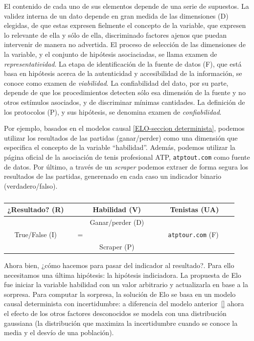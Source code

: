 \documentclass[a4paper,10pt]{book}
\begin{document}

El contenido de cada uno de sus elementos depende de una serie de supuestos.
La validez interna de un dato depende en gran medida de las dimensiones (D) elegidas, de que estas expresen fielmente el concepto de la variable, que expresen lo relevante de ella y sólo de ella, discriminado factores ajenos que puedan intervenir de manera no advertida.
El proceso de selección de las dimensiones de la variable, y el conjunto de hipótesis asociaciadas, se llama examen de \emph{representatividad}.
La etapa de identificación de la fuente de datos (F), que está basa en hipótesis acerca de la autenticidad y accesibilidad de la información, se conoce como examen de \emph{viabilidad}.
La confiabilidad del dato, por su parte, depende de que los procedimientos detecten sólo esa dimensión de la fuente y no otros estímulos asociados, y de discriminar mínimas cantidades.
La definición de los protocolos (P), y sus hipótesis, se denomina examen de \emph{confiabilidad}.


Por ejemplo, basados en el modelos causal \ref{ELO-seccion determinista}, podemos utilizar los resultados de las partidas (ganar/perder) como una dimensión que especifica el concepto de la variable ``habilidad''.
Además, podemos utilizar la página oficial de la asociación de tenis profesional ATP, \texttt{atptout.com} como fuente de datos.
Por último, a través de un \emph{scraper} podemos extraer de forma segura los resultados de las partidas, generenado en cada caso un indicador binario (verdadero/falso).


\begin{table}[ht!]
\centering
\begin{tabular}{clcccc}
¿Resultado? (R) & \multicolumn{1}{r|}{} &  & Habilidad (V) &  &  \multicolumn{1}{|c}{Tenistas (UA)} \\ \hline
   &  \multicolumn{1}{r|}{}    &  & Ganar/perder (D) &  & \multicolumn{1}{|r}{} \\
                 True/False (I)  &   & =  &  &  & \ \ \ \texttt{atptour.com} (F) \ \ \  \\
 & \multicolumn{1}{r|}{} &  & Scraper (P) &        &      \multicolumn{1}{|r}{}
\end{tabular}
\caption{}
\label{tab:operacionalizacion_habilidad}
\end{table}


Ahora bien, ¿cómo hacemos para pasar del indicador al resultado?.
Para ello necesitamos una última hipótesis: la hipótesis indiciadora.
La propuesta de Elo fue iniciar la variable habilidad con un valor arbitrario y actualizarla en base a la sorpresa.
Para computar la sorpresa, la solución de Elo se basa en un modelo causal determinista con incertidumbre: a diferencia del modelo anterior~\ref{} ahora el efecto de los otros factores desconocidos se modela con una distribución gaussiana (la distribución que maximiza la incertidumbre cuando se conoce la media y el desvío de una población).
\end{document}
